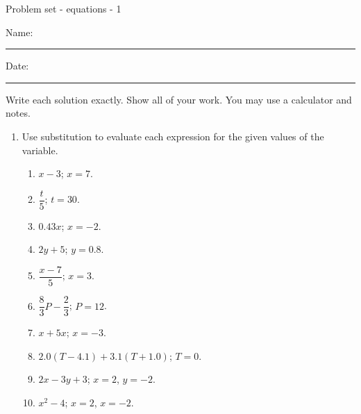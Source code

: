 \documentclass[12pt]{article}
\begin{document}
\pagestyle{empty} %
\begin{center}
          Problem set - equations - 1 \\[0.5in]
\end{center}
Name: \rule{4in}{0.005in} Date: \rule{1.5in}{0.005in} 
  \vspace{0.25in}

Write each solution exactly. Show all of your work. You may use a calculator and notes. 
\begin{enumerate}
\newcommand{\spacing}{\vspace{0.50in}}
\item Use substitution to evaluate each expression for the given values of the variable. 
	\begin{multicols}{2}
	\begin{enumerate}
    	\item \hspace{0.50in} $x-3$; $x=7$.
	\spacing

	\item \hspace{0.50in} $\dfrac{t}{5}$; $t=30$.
	\spacing

    	\item \hspace{0.50in} $0.43x$; $x=-2$.
  	\spacing

    	\item \hspace{0.50in} $2y+5$; $y=0.8$.
	\spacing

	\item \hspace{0.50in} $\dfrac{x-7}{5}$; $x=3$.
	\spacing

	\item \hspace{0.50in} $\dfrac{8}{3}P-\dfrac{2}{3}$; $P=12$.
	\spacing

    	\item \hspace{0.50in} $x+5x$; $x=-3$.
	\spacing

	\item \hspace{0.50in} $2.0(T-4.1)+3.1(T+1.0)$; $T=0$.
	\spacing

	\item \hspace{0.50in} $2x-3y+3$; $x=2$, $y=-2$.
	\spacing

	\item \hspace{0.50in} $x^2-4$; $x=2$, $x=-2$.
	\spacing


\end{enumerate}
\end{multicols}
\end{enumerate}
\end{document}
